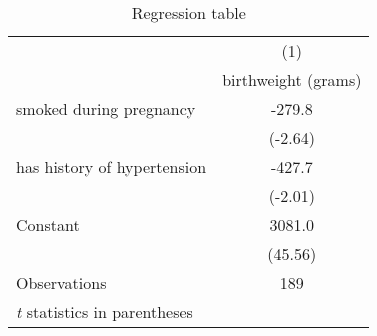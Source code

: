 \documentclass{article}
\begin{document}
\begin{table}[htbp]\centering
\caption{Regression table\label{tab1}}
\begin{tabular}{l*{1}{c}}
\hline\hline
                    &\multicolumn{1}{c}{(1)}\\
                    &\multicolumn{1}{c}{birthweight (grams)}\\
\hline
smoked during pregnancy&      -279.8\\
                    &     (-2.64)\\
[1em]
has history of hypertension&      -427.7\\
                    &     (-2.01)\\
[1em]
Constant            &      3081.0\\
                    &     (45.56)\\
\hline
Observations        &         189\\
\hline\hline
\multicolumn{2}{l}{\footnotesize \textit{t} statistics in parentheses}\\
\end{tabular}
\end{table}
\end{document}
